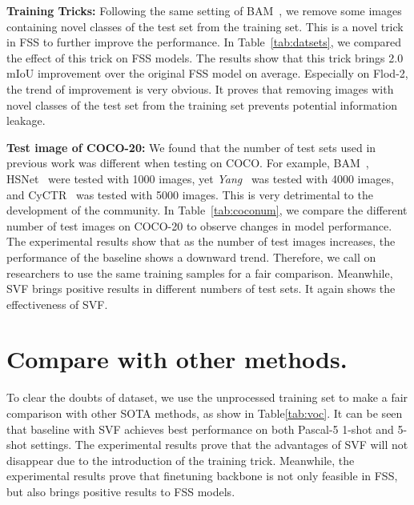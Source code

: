 \documentclass{article}
\begin{document}
\textbf{Training Tricks:} Following the same setting of BAM~\cite{lang2022learning}, we remove some images containing novel classes of the test set from the training set. This is a novel trick in FSS to further improve the performance. In Table~\ref{tab:datsets}, we compared the effect of this trick on FSS models. The results show that this trick brings 2.0 mIoU improvement over the original FSS model on average. Especially on Flod-2, the trend of improvement is very obvious. It proves that removing images with novel classes of the test set from the training set prevents potential information leakage.

\textbf{Test image of COCO-20:} We found that the number of test sets used in previous work was different when testing on COCO. For example, BAM~\cite{lang2022learning}, HSNet~\cite{min2021hypercorrelation} were tested with 1000 images, yet \emph{Yang}~\cite{yang2021mining} was tested with 4000 images, and CyCTR~\cite{zhang2021few} was tested with 5000 images. This is very detrimental to the development of the community. In Table~\ref{tab:coconum}, we compare the different number of test images on COCO-20 to observe changes in model performance. The experimental results show that as the number of test images increases, the performance of the baseline shows a downward trend. Therefore, we call on researchers to use the same training samples for a fair comparison. Meanwhile, SVF brings positive results in different numbers of test sets. It again shows the effectiveness of SVF. 



\vspace{-0.7em}
\section{Compare with other methods.}
\vspace{-0.7em}
To clear the doubts of dataset, we use the unprocessed training set to make a fair comparison with other SOTA methods, as show in Table\ref{tab:voc}. It can be seen that baseline with SVF achieves best performance on both Pascal-5 1-shot and 5-shot settings. The experimental results prove that the advantages of SVF will not disappear due to the introduction of the training trick. Meanwhile, the experimental results prove that finetuning backbone is not only feasible in FSS, but also brings positive results to FSS models.
\end{document}
